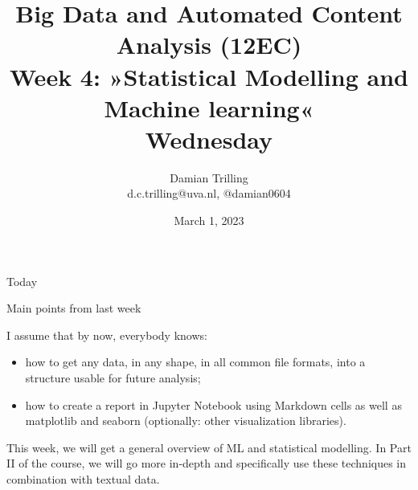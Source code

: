 

\graphicspath{{../../resources/img/}}




\title[Big Data and Automated Content Analysis]{\textbf{Big Data and Automated Content Analysis (12EC)} 
\\Week 4: »Statistical Modelling and Machine learning«
\\Wednesday}
\author[Damian Trilling]{Damian Trilling\\ \footnotesize{d.c.trilling@uva.nl, @damian0604 \\}}
\date{March 1, 2023}


\begin{frame}{}
	\titlepage
\end{frame}

\begin{frame}{Today}
	\tableofcontents
\end{frame}





\begin{frame}{Main points from last week}

\begin{alertblock}{I assume that by now, everybody knows:}
\begin{itemize}
\item how to get any data, in any shape, in all common file formats, into a structure usable for future analysis;
\item how to create a report in Jupyter Notebook using Markdown cells as well as matplotlib and seaborn (optionally: other visualization libraries).
\end{itemize}
\end{alertblock}
\end{frame}


\begin{frame}[standout]
This week, we will get a general overview of ML and statistical modelling. In Part II of the course, we will go more in-depth and specifically use these techniques in combination with textual data.
\end{frame}














